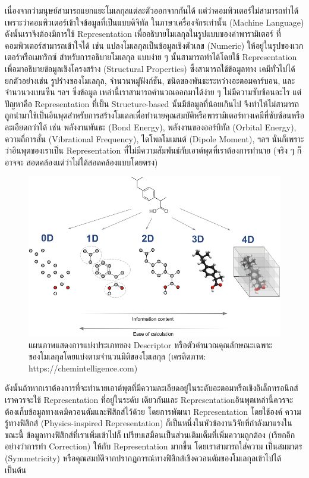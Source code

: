 เนื่องจากว่ามนุษย์สามารถแยกแยะโมเลกุลแต่ละตัวออกจากกันได้ แต่ว่าคอมพิวเตอร์ไม่สามารถทำได้เพราะว่าคอมพิวเตอร์เข้าใจข้อมูลที่เป็นแบบดิจิทัล%
ในภาษาเครื่องจักรเท่านั้น (Machine Language) ดังนั้นเราจึงต้องมีการใช้ Representation เพื่ออธิบายโมเลกุลในรูปแบบของค่าพารามิเตอร์%
ที่คอมพิวเตอร์สามารถเข้าใจได้ เช่น แปลงโมเลกุลเป็นข้อมูลเชิงตัวเลข (Numeric) ให้อยู่ในรูปของเวกเตอร์หรือเมทริกซ์ สำหรับการอธิบายโมเลกุล%
แบบง่าย ๆ นั้นสามารถทำได้โดยใช้ Representation เพื่อมาอธิบายข้อมูลเชิงโครงสร้าง (Structural Properties) ซึ่งสามารถใช้ข้อมูลทาง%
เคมีทั่วไปได้ ยกตัวอย่างเช่น รูปร่างของโมเลกุล, จำนวนหมู่ฟังก์ชัน, ชนิดของพันธะระหว่างอะตอมคาร์บอน, และจำนวนวงเบนซีน ฯลฯ ซึ่งข้อมูล%
เหล่านี้เราสามารถคำนวณออกมาได้ง่าย ๆ ไม่มีความซับซ้อนอะไร แต่ปัญหาคือ Representation ที่เป็น Structure-based นั้นมีข้อมูลที่น้อยเกินไป 
จึงทำให้ไม่สามารถถูกนำมาใช้เป็นอินพุตสำหรับการสร้างโมเดลเพื่อทำนายคุณสมบัติหรือพารามิเตอร์ทางเคมีที่ซับซ้อนหรือละเอียดกว่าได้ เช่น 
พลังงานพันธะ (Bond Energy), พลังงานของออร์บิทัล (Orbital Energy), ความถี่การสั่น (Vibrational Frequency), ไดโพลโมเมนต์ 
(Dipole Moment), ฯลฯ นั่นก็เพราะว่าอินพุตของเราเป็น Representation ที่ไม่มีความสัมพันธ์กับเอาต์พุตที่เราต้องการทำนาย (จริง ๆ ก็อาจจะ%
สอดคล้องแต่ว่าไม่ได้สอดคล้องแบบโดยตรง)

\begin{figure}[htbp]
    \centering
    \includegraphics[width=\linewidth]{fig/descriptor_classes.png}
    \caption{แผนภาพแสดงการแบ่งประเภทของ Descriptor หรือตัวคำนวณคุณลักษณะเฉพาะของโมเลกุลโดยแบ่งตามจำนวนมิติของโมเลกุล 
    (เครดิตภาพ: https://chemintelligence.com)}
    \label{fig:descriptor_classes}
\end{figure}

ดังนั้นถ้าหากเราต้องการที่จะทำนายเอาต์พุตที่มีความละเอียดอยู่ในระดับอะตอมหรือเชิงอิเล็กทรอนิกส์ เราควรจะใช้ Representation ที่อยู่ในระดับ%
เดียวกันและ Representationอินพุตเหล่านี้ควรจะต้องเก็บข้อมูลทางเคมีควอนตัมและฟิสิกส์ไว้ด้วย โดยการพัฒนา Representation โดยใช้องค์%
ความรู้ทางฟิสิกส์ (Physics-inspired Representation) ก็เป็นหนึ่งในหัวข้องานวิจัยที่กำลังมาแรงในขณะนี้ ข้อมูลทางฟิสิกส์ที่เราเพิ่มเข้าไปก็%
เปรียบเสมือนเป็นส่วนเติมเต็มที่เพิ่มความถูกต้อง (เรียกอีกอย่างว่าการทำ Correction) ให้กับ Representation มากขึ้น โดยเราสามารถใส่ความ%
เป็นสมมาตร (Symmetricity) หรือคุณสมบัติจากปรากฎการณ์ทางฟิสิกส์เชิงควอนตัมของโมเลกุลเข้าไปได้ เป็นต้น 

